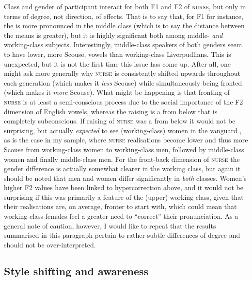 Class and gender of participant interact for both F1 and F2 of \textsc{nurse}, but only in terms of degree, not direction, of effects.
That is to say that, for F1 for instance, the  is more pronounced in the middle class (which is to say the distance between the means is greater), but it is highly significant both among middle- \emph{and} working-class subjects.
Interestingly, middle-class speakers of both genders seem to have lower, more Scouse, vowels than working-class Liverpudlians.
This is unexpected, but it is not the first time this issue has come up.
After all, one might ask more generally why \textsc{nurse} is consistently shifted upwards throughout each generation (which makes it \emph{less} Scouse) while simultaneously being fronted (which makes it \emph{more} Scouse).
What might be happening is that fronting of \textsc{nurse} is at least a semi-conscious process due to the social importance of the F2 dimension of English vowels, whereas the raising is a  from below that is completely subconscious.
If raising of \textsc{nurse} was a  from below it would not be surprising, but actually \emph{expected} to see (working-class) women in the vanguard \parencite[cf.][292--293]{labov2001a}, as is the case in my sample, where \textsc{nurse} realisations become lower and thus more Scouse from working-class women to working-class men, followed by middle-class women and finally middle-class men.
For the front-back dimension of \textsc{nurse} the gender difference is actually somewhat clearer in the working class, but again it should be noted that men and women differ significantly in \emph{both} classes.
Women's higher F2 values have been linked to hypercorrection above, and it would not be surprising if this was primarily a feature of the (upper) working class, given that their realisations are, on average, fronter to start with, which could mean that working-class females feel a greater need to ``correct'' their pronunciation.
As a general note of caution, however, I would like to repeat that the results summarised in this paragraph pertain to rather subtle differences of degree and should not be over-interpreted.

\subsection{Style shifting and awareness}
\label{prod.disc.nurse.style}

